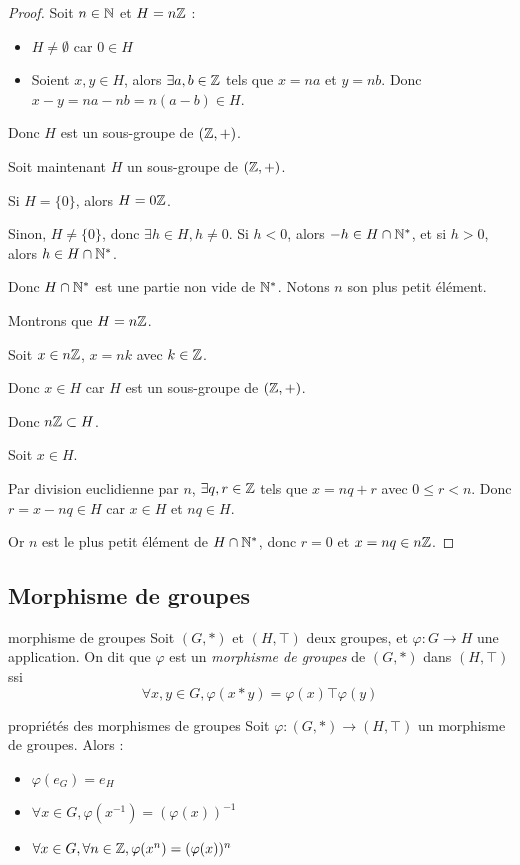 \begin{proof}
    Soit $n \in \mathbb{N}$ et $H = n \mathbb{Z}$ : 
    \begin{itemize}
        \item $H \neq \emptyset$ car $0 \in H$
        \item Soient $x, y \in H$, alors $\exists a, b \in \mathbb{Z}$ tels que $x = na$ et $y = nb$.
        Donc $x - y = na - nb = n(a - b) \in H$.
    \end{itemize}

    Donc $H$ est un sous-groupe de $(\mathbb{Z}, +)$.

    Soit maintenant $H$ un sous-groupe de $(\mathbb{Z}, +)$. 
    
    Si $H = \{0\}$, alors $H = 0 \mathbb{Z}$.

    Sinon, $H \neq \{0\}$, donc $\exists h \in H, h \neq 0$.
    Si $h < 0$, alors $-h \in H \cap \mathbb{N}^*$, et si $h > 0$, alors $h \in H \cap \mathbb{N}^*$.

    Donc $H \cap \mathbb{N}^*$ est une partie non vide de $\mathbb{N}^*$. Notons $n$ son plus petit élément.

    Montrons que $H = n \mathbb{Z}$.
    
    Soit $x \in n \mathbb{Z}$, $x = nk$ avec $k \in \mathbb{Z}$.

    Donc $x \in H$ car $H$ est un sous-groupe de $(\mathbb{Z}, +)$.

    Donc $n \mathbb{Z} \subset H$.

    Soit $x \in H$. 

    Par division euclidienne par $n$, $\exists q, r \in \mathbb{Z}$ tels que $x = nq + r$ avec $0 \leq r < n$.
    Donc $r = x - nq \in H$ car $x \in H$ et $nq \in H$.

    Or $n$ est le plus petit élément de $H \cap \mathbb{N}^*$, donc $r = 0$ et $x = nq \in n \mathbb{Z}$.
\end{proof}

\subsection{Morphisme de groupes }

\begin{definition}{morphisme de groupes}{}
    Soit $(G, \ast)$ et $(H, \top)$ deux groupes, et $\varphi : G \to H$ une application.
    On dit que $\varphi$ est un \emph{morphisme de groupes} de $(G, \ast)$ dans $(H, \top)$ ssi
    $$\forall x, y \in G, \varphi(x \ast y) = \varphi(x) \top \varphi(y)$$
\end{definition}

\begin{proposition}{propriétés des morphismes de groupes}{}
    Soit $\varphi : (G, \ast) \to (H, \top)$ un morphisme de groupes.
    Alors :
    \begin{itemize}
        \item $\varphi(e_G) = e_H$
        \item $\forall x \in G, \varphi(x^{-1}) = (\varphi(x))^{-1}$
        \item $\forall x \in G, \forall n \in \mathbb{Z}, \varphi(x^n) = (\varphi(x))^n$
    \end{itemize}
\end{proposition}

